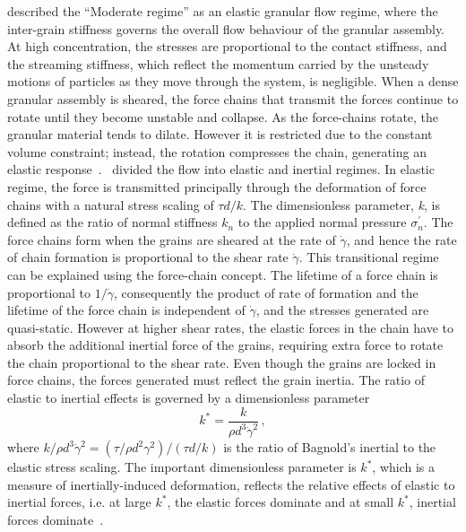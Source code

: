\citet{Campbell2002} described the ``Moderate regime'' as an elastic granular 
flow regime, where the inter-grain stiffness governs the overall flow 
behaviour of the granular assembly. At high concentration, the stresses are 
proportional to the contact stiffness, and the streaming stiffness, which  
reflect the momentum carried by the unsteady motions of particles as they
move through the system, is negligible. When a dense granular assembly is 
sheared, the force chains that transmit the forces continue to rotate until 
they become unstable and collapse. As the force-chains rotate, the granular 
material tends to dilate. However it is 
restricted due to the constant volume constraint; instead, the rotation 
compresses the chain, generating an elastic 
response~\citep{Campbell2006}.~\citet{Campbell2002} divided the flow into 
elastic and inertial regimes. In elastic regime, the force is 
transmitted principally through the deformation of force chains with a natural 
stress scaling of $\tau \textit{d}/\textit{k}$. The dimensionless parameter, 
\textit{k}, is defined as the ratio of normal stiffness $k_n$ to 
the applied normal pressure $\sigma_n^\prime$. The force 
chains form when the grains are sheared at the rate of $\dot{\gamma}$, and 
hence the rate of chain formation is proportional to the shear rate 
$\dot{\gamma}$. This transitional regime can be explained using the force-chain 
concept. The lifetime of a force chain is proportional to $1/\dot{\gamma}$, 
consequently the 
product of rate of formation and the lifetime of the force chain is independent 
of $\dot{\gamma}$, and the stresses generated are quasi-static. However at 
higher shear rates, the elastic forces in the chain have to absorb the 
additional inertial force of the grains, requiring extra force to rotate the 
chain proportional to the shear rate. Even though the grains are locked in 
force chains, the forces generated must reflect the grain inertia. The ratio of 
elastic to inertial effects is governed by a dimensionless parameter
%
\begin{equation}
\textit{k}^{*} = \frac{k}{\rho \textit{d}^{3} \dot{\gamma}^{2}} \,,
\end{equation}
%
where ${k}/{\rho \textit{d}^{3} \dot{\gamma}^{2}}=({\tau}/{\rho \textit{d}^{2} 
{\gamma}^{2}})/(\tau\textit{d}/\textit{k})$ is the ratio of Bagnold's inertial 
to the elastic stress scaling. The important dimensionless parameter is 
$\textit{k}^{*}$, which is a measure of inertially-induced deformation, 
reflects the relative effects of elastic to inertial forces, i.e. at large 
$\textit{k}^{*}$, the elastic forces dominate and at small $\textit{k}^{*}$, 
inertial forces dominate~\citep{Campbell2006}.

